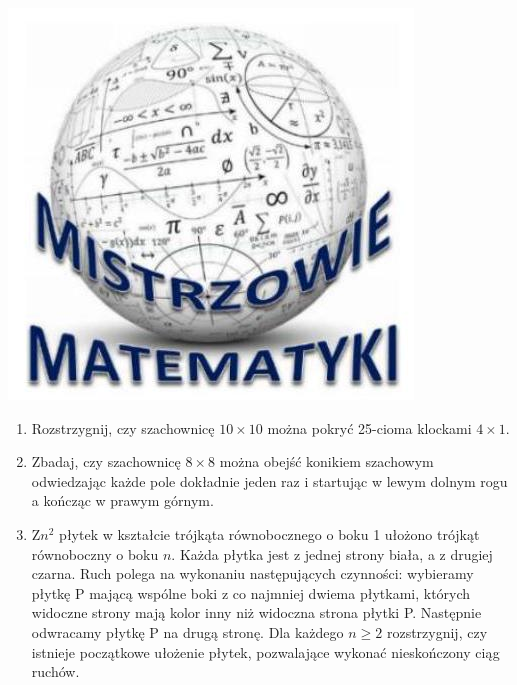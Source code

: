 \documentclass[10pt]{article}
\begin{document}
\begin{center}
\includegraphics[max width=\textwidth]{2024_11_21_b8f206055f1c7e84536bg-1}
\end{center}

\begin{enumerate}
  \item Rozstrzygnij, czy szachownicę \(10 \times 10\) można pokryć 25-cioma klockami \(4 \times 1\).
  \item Zbadaj, czy szachownicę \(8 \times 8\) można obejść konikiem szachowym odwiedzając każde pole dokładnie jeden raz i startując w lewym dolnym rogu a kończąc w prawym górnym.
  \item \(\mathrm{Z} n^{2}\) płytek w kształcie trójkąta równobocznego o boku 1 ułożono trójkąt równoboczny o boku \(n\). Każda płytka jest z jednej strony biała, a z drugiej czarna. Ruch polega na wykonaniu następujących czynności: wybieramy płytkę P mającą wspólne boki z co najmniej dwiema płytkami, których widoczne strony mają kolor inny niż widoczna strona płytki P. Następnie odwracamy płytkę P na drugą stronę. Dla każdego \(n \geq 2\) rozstrzygnij, czy istnieje początkowe ułożenie płytek, pozwalające wykonać nieskończony ciąg ruchów.
\end{enumerate}
\end{document}
